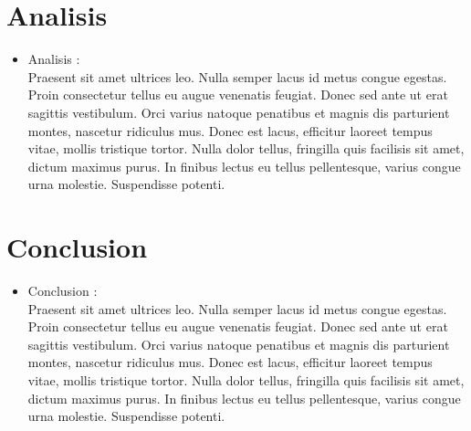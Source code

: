 \documentclass[preprint,12pt]{elsarticle}
\begin{document}
\section{Analisis}
\begin{itemize}
\item Analisis : \\

Praesent sit amet ultrices leo. Nulla semper lacus id metus congue egestas. Proin consectetur tellus eu augue venenatis feugiat. Donec sed ante ut erat sagittis vestibulum. Orci varius natoque penatibus et magnis dis parturient montes, nascetur ridiculus mus. Donec est lacus, efficitur laoreet tempus vitae, mollis tristique tortor. Nulla dolor tellus, fringilla quis facilisis sit amet, dictum maximus purus. In finibus lectus eu tellus pellentesque, varius congue urna molestie. Suspendisse potenti.



\end{itemize}
\section{Conclusion}
\begin{itemize}
\item Conclusion : \\

Praesent sit amet ultrices leo. Nulla semper lacus id metus congue egestas. Proin consectetur tellus eu augue venenatis feugiat. Donec sed ante ut erat sagittis vestibulum. Orci varius natoque penatibus et magnis dis parturient montes, nascetur ridiculus mus. Donec est lacus, efficitur laoreet tempus vitae, mollis tristique tortor. Nulla dolor tellus, fringilla quis facilisis sit amet, dictum maximus purus. In finibus lectus eu tellus pellentesque, varius congue urna molestie. Suspendisse potenti.


\end{itemize}

	
	\newpage
	
	 	
		 
\citep{referencia01}  
\citep{referencia02}  
\citep{referencia03}  
\citep{referencia04}  
\citep{referencia05}  
\citep{referencia06}  
\citep{referencia07}  
\end{document}
